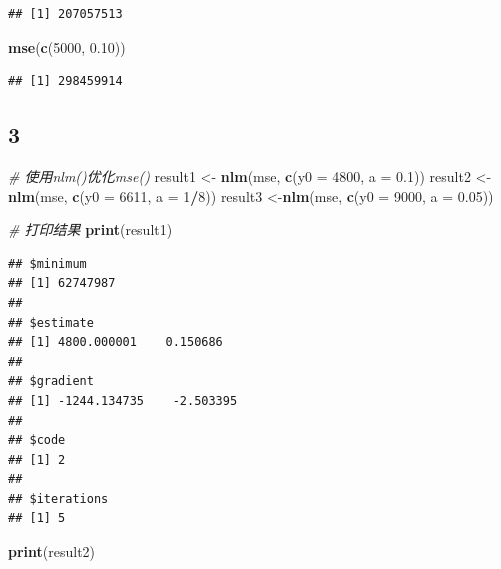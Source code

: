 \documentclass[
]{article}
\newenvironment{Shaded}{\begin{snugshade}}{\end{snugshade}}
\newcommand{\AttributeTok}[1]{\textcolor[rgb]{0.13,0.29,0.53}{#1}}
\newcommand{\CommentTok}[1]{\textcolor[rgb]{0.56,0.35,0.01}{\textit{#1}}}
\newcommand{\DecValTok}[1]{\textcolor[rgb]{0.00,0.00,0.81}{#1}}
\newcommand{\FloatTok}[1]{\textcolor[rgb]{0.00,0.00,0.81}{#1}}
\newcommand{\FunctionTok}[1]{\textcolor[rgb]{0.13,0.29,0.53}{\textbf{#1}}}
\newcommand{\NormalTok}[1]{#1}
\newcommand{\OtherTok}[1]{\textcolor[rgb]{0.56,0.35,0.01}{#1}}
\newcommand{\SpecialCharTok}[1]{\textcolor[rgb]{0.81,0.36,0.00}{\textbf{#1}}}
\begin{document}
\begin{verbatim}
## [1] 207057513
\end{verbatim}

\begin{Shaded}
\begin{Highlighting}[]
\FunctionTok{mse}\NormalTok{(}\FunctionTok{c}\NormalTok{(}\DecValTok{5000}\NormalTok{, }\FloatTok{0.10}\NormalTok{))}
\end{Highlighting}
\end{Shaded}

\begin{verbatim}
## [1] 298459914
\end{verbatim}

\subsection{3}\label{section-2}

\begin{Shaded}
\begin{Highlighting}[]
\CommentTok{\# 使用nlm()优化mse()}
\NormalTok{result1 }\OtherTok{\textless{}{-}} \FunctionTok{nlm}\NormalTok{(mse, }\FunctionTok{c}\NormalTok{(}\AttributeTok{y0 =} \DecValTok{4800}\NormalTok{, }\AttributeTok{a =} \FloatTok{0.1}\NormalTok{))}
\NormalTok{result2 }\OtherTok{\textless{}{-}}\FunctionTok{nlm}\NormalTok{(mse, }\FunctionTok{c}\NormalTok{(}\AttributeTok{y0 =} \DecValTok{6611}\NormalTok{, }\AttributeTok{a =} \DecValTok{1}\SpecialCharTok{/}\DecValTok{8}\NormalTok{))}
\NormalTok{result3 }\OtherTok{\textless{}{-}}\FunctionTok{nlm}\NormalTok{(mse, }\FunctionTok{c}\NormalTok{(}\AttributeTok{y0 =} \DecValTok{9000}\NormalTok{, }\AttributeTok{a =} \FloatTok{0.05}\NormalTok{))}

\CommentTok{\# 打印结果}
\FunctionTok{print}\NormalTok{(result1)}
\end{Highlighting}
\end{Shaded}

\begin{verbatim}
## $minimum
## [1] 62747987
## 
## $estimate
## [1] 4800.000001    0.150686
## 
## $gradient
## [1] -1244.134735    -2.503395
## 
## $code
## [1] 2
## 
## $iterations
## [1] 5
\end{verbatim}

\begin{Shaded}
\begin{Highlighting}[]
\FunctionTok{print}\NormalTok{(result2)}
\end{Highlighting}
\end{Shaded}
\end{document}
